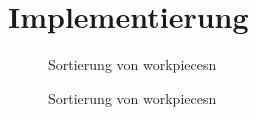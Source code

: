 \chapter{Implementierung}\label{ch:implementierung}

\begin{figure}
    \caption{Sortierung von \glspl{workpiece}n}
    \label{fig:stm_operation_manager}
\end{figure}


\begin{figure}
    \caption{Sortierung von \glspl{workpiece}n}
    \label{fig:stm_base_top_level}
\end{figure}





